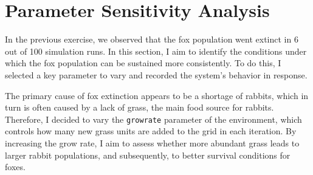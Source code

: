 \section{Parameter Sensitivity Analysis }

In the previous exercise, we observed that the fox population went extinct in 6 out of 100 simulation runs. In this section, I aim to identify the conditions under which the fox population can be sustained more consistently. To do this, I selected a key parameter to vary and recorded the system's behavior in response.

The primary cause of fox extinction appears to be a shortage of rabbits, which in turn is often caused by a lack of grass, the main food source for rabbits. Therefore, I decided to vary the \texttt{growrate} parameter of the environment, which controls how many new grass units are added to the grid in each iteration. By increasing the grow rate, I aim to assess whether more abundant grass leads to larger rabbit populations, and subsequently, to better survival conditions for foxes.
